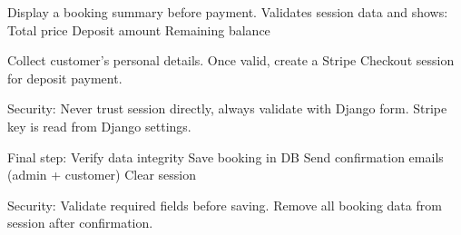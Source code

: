 \documentclass[letterpaper,10pt,english]{sphinxmanual}
\begin{document}

\begin{fulllineitems}
\label{\detokenize{index:bookings.views.booking_summary}}
\pysigstartsignatures
\pysiglinewithargsret
{}
{}
{}
\pysigstopsignatures
\sphinxAtStartPar
Display a booking summary before payment.
Validates session data and shows:
\sphinxhyphen{} Total price
\sphinxhyphen{} Deposit amount
\sphinxhyphen{} Remaining balance

\end{fulllineitems}


\begin{fulllineitems}
\label{\detokenize{index:bookings.views.booking_details}}
\pysigstartsignatures
\pysiglinewithargsret
{}
{}
{}
\pysigstopsignatures
\sphinxAtStartPar
Collect customer’s personal details.
Once valid, create a Stripe Checkout session for deposit payment.

\sphinxAtStartPar
Security:
\sphinxhyphen{} Never trust session directly, always validate with Django form.
\sphinxhyphen{} Stripe key is read from Django settings.

\end{fulllineitems}


\begin{fulllineitems}
\label{\detokenize{index:bookings.views.booking_confirm}}
\pysigstartsignatures
\pysiglinewithargsret
{}
{}
{}
\pysigstopsignatures
\sphinxAtStartPar
Final step:
\sphinxhyphen{} Verify data integrity
\sphinxhyphen{} Save booking in DB
\sphinxhyphen{} Send confirmation emails (admin + customer)
\sphinxhyphen{} Clear session

\sphinxAtStartPar
Security:
\sphinxhyphen{} Validate required fields before saving.
\sphinxhyphen{} Remove all booking data from session after confirmation.

\end{fulllineitems}
\end{document}
